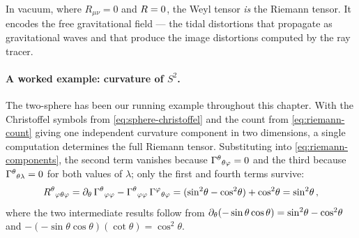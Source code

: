 In vacuum, where $R_{\mu\nu} = 0$ and $R = 0$, the Weyl tensor
\emph{is} the Riemann tensor.  It encodes the free gravitational field ---
the tidal distortions that propagate as gravitational waves and that produce
the image distortions computed by the ray tracer.

\paragraph{A worked example: curvature of $S^2$.}

The two-sphere has been our running example throughout this chapter.  With
the Christoffel symbols from \cref{eq:sphere-christoffel} and the count from
\cref{eq:riemann-count} giving one independent curvature component in two
dimensions, a single computation determines the full Riemann tensor.
Substituting into \cref{eq:riemann-components}, the second term vanishes
because $\Gamma^{\theta}{}_{\theta \varphi} = 0$ and the third because
$\Gamma^{\theta}{}_{\theta \lambda} = 0$ for both values of $\lambda$;
only the first and fourth terms survive:
%
\begin{equation}
  R^{\theta}{}_{\varphi \theta \varphi}
  = \partial_{\theta}\,\Gamma^{\theta}{}_{\varphi \varphi}
    - \Gamma^{\theta}{}_{\varphi \varphi}\,
      \Gamma^{\varphi}{}_{\theta \varphi}
  = (\sin^2\!\theta - \cos^2\!\theta) + \cos^2\!\theta
  = \sin^2\!\theta \,,
  \label{eq:sphere-riemann}
\end{equation}
%
where the two intermediate results follow from
$\partial_{\theta}(-\sin\theta\cos\theta) = \sin^2\!\theta - \cos^2\!\theta$
and $-(-\sin\theta\cos\theta)(\cot\theta) = \cos^2\!\theta$.

